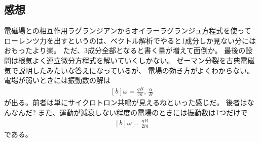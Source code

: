 \documentclass[../../master.tex]{subfiles}
\begin{document}

\subsection*{感想}
電磁場との相互作用ラグランジアンからオイラーラグランジュ方程式を使って
ローレンツ力を出すというのは、ベクトル解析でやると1成分しか見ない分にはおもったより楽。
ただ、3成分全部となると書く量が増えて面倒か。
最後の設問は根気よく連立微分方程式を解いていくしかない。
ゼーマン分裂を古典電磁気で説明したみたいな答えになっているが、
電場の効き方がよくわからない。
電場が弱いときには振動数の解は
\begin{equation}\begin{aligned}[b]
    \omega = \frac{qB}{m},\,\frac{\alpha}{B}
\end{aligned}\end{equation}
が出る。前者は単にサイクロトロン共鳴が見えるねといった感じだ。
後者はなんなんだ?
また、運動が減衰しない程度の電場のときには振動数は1つだけで
\begin{equation}\begin{aligned}[b]
    \omega = \frac{qB}{2m}
\end{aligned}\end{equation}
である。
\end{document}
